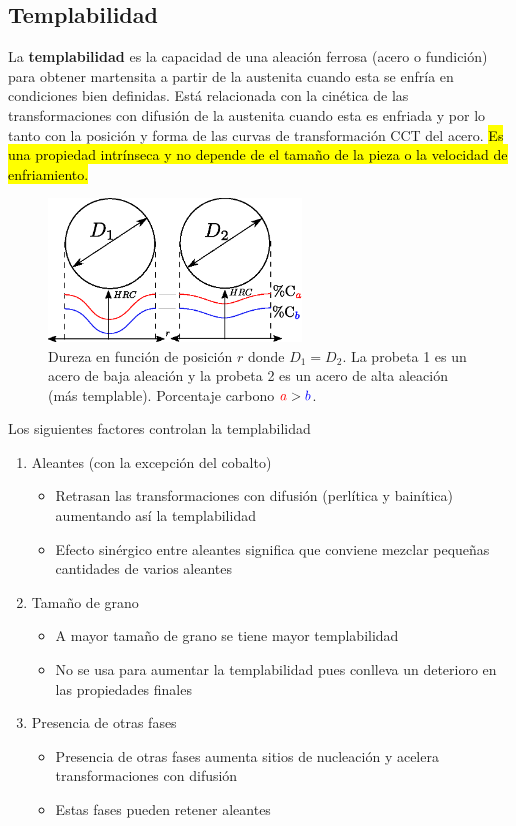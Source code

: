 \documentclass{article}
\begin{document}
\subsection{Templabilidad}
La \textbf{templabilidad} es la capacidad de una aleación ferrosa (acero o fundición) para obtener martensita a partir de la austenita cuando esta se enfría en condiciones bien definidas. Está relacionada con la cinética de las transformaciones con difusión de la austenita cuando esta es enfriada y por lo tanto con la posición y forma de las curvas de transformación CCT del acero. \hl{Es una propiedad intrínseca y no depende de el tamaño de la pieza o la velocidad de enfriamiento.}
\begin{figure}[htb!]
    \centering
    \includegraphics[width=0.6\textwidth]{fig/Templabilidad.eps}
    \caption{Dureza en función de posición $r$ donde $D_1 = D_2$. La probeta 1 es un acero de baja aleación y la probeta 2 es un acero de alta aleación (más templable). Porcentaje carbono ${\color{red} a}> {\color{blue} b}$. }
    \label{fig:templabilidad}
\end{figure}
Los siguientes factores controlan la templabilidad
\begin{enumerate}
    \item Aleantes (con la excepción del cobalto)
    \begin{itemize}
        \item Retrasan las transformaciones con difusión (perlítica y bainítica) aumentando así la templabilidad
        \item Efecto sinérgico entre aleantes significa que conviene mezclar pequeñas cantidades de varios aleantes
    \end{itemize}
    \item Tamaño de grano
    \begin{itemize}
        \item A mayor tamaño de grano se tiene mayor templabilidad
        \item No se usa para aumentar la templabilidad pues conlleva un deterioro en las propiedades finales
    \end{itemize}
    \item Presencia de otras fases
    \begin{itemize}
        \item Presencia de otras fases aumenta sitios de nucleación y acelera transformaciones con difusión
        \item Estas fases pueden retener aleantes
    \end{itemize}
\end{enumerate}
\end{document}
